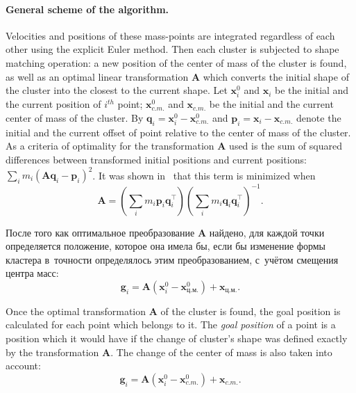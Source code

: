 \documentclass[a4paper, 12pt, titlepage]{extarticle}
\newcommand{\vect}[1]{\mathbf{#1}} %
\newcommand{\matx}[1]{\mathbf{#1}} %
\newcommand{\transposed}{\top} %
\begin{document}
        \paragraph{General scheme of the algorithm.} Velocities and positions of these mass-points
        are integrated regardless of each other using the explicit Euler method. Then each cluster is
        subjected to shape matching operation: a new position of the center of mass of the cluster
        is found, as well as an optimal linear transformation $\matx A$ which converts the initial
        shape of the cluster into the closest to the current shape. Let $\vect{x}^0_i$ and
        $\vect{x}_i$ be the initial and the current position of $i^{th}$ point; $\vect{x}^0_{c.m.}$
        and $\vect{x}_{c.m.}$ be the initial and the current center of mass of the cluster. By
        $\vect{q}_i = \vect{x}^0_i - \vect{x}^0_{c.m.}$ and $\vect{p}_i = \vect{x}_i -
        \vect{x}_{c.m.}$ denote the initial and the current offset of point relative to the center
        of mass of the cluster. As a criteria of optimality for the transformation $\matx A$ used is
        the sum of squared differences between transformed initial positions and current positions:
        $\sum_i m_i (\matx A \vect{q}_i - \vect{p}_i )^2$. It was shown in~\cite{mueller-meshless}
        that this term is minimized when
        \begin{equation}
          \matx A = \left( \sum_i m_i \vect{p}_i \vect{q}_i^\transposed \right)
                    \left( \sum_i m_i \vect{q}_i \vect{q}_i^\transposed \right)^{-1}.
        \end{equation}

\begin{original}
        После того как оптимальное преобразование $\matx A$ найдено, для каждой точки определяется
        положение, которое она имела бы, если бы изменение формы кластера в~точности определялось этим
        преобразованием, с~учётом смещения центра масс:
        \begin{equation}
          \vect{g}_i = \matx{A} (\vect{x}^0_i - \vect{x}^0_{ц.м.}) + \vect{x}_{ц.м.}.
        \end{equation}
\end{original}

        Once the optimal transformation $\matx A$ of the cluster is found, the goal position is
        calculated for each point which belongs to it. The \emph{goal position} of a point is a
        position which it would have if the change of cluster's shape was defined exactly by the
        transformation $\matx A$. The change of the center of mass is also taken into account:
        \begin{equation}
          \vect{g}_i = \matx{A} (\vect{x}^0_i - \vect{x}^0_{c.m.}) + \vect{x}_{c.m.}.
        \end{equation}
\end{document}
